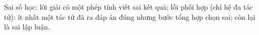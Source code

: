 Sai số học: lời giải có một phép tính viết sai kết quả; lỗi phối hợp (chỉ hệ đa tác tử): ít nhất một tác tử đã ra đáp án đúng nhưng bước tổng hợp chọn sai; còn lại là sai lập luận.
